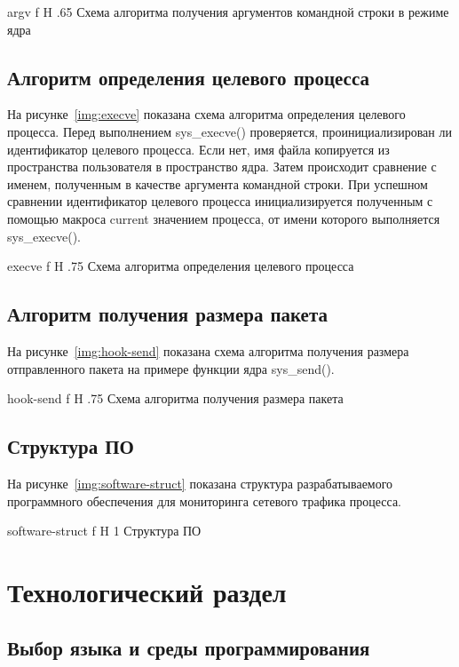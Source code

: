 \documentclass{bmstu}
\begin{document}
    {argv}
    {f}
    {H}
    {.65\textwidth}
    {Схема алгоритма получения аргументов командной строки в режиме ядра}

\pagebreak
\section{Алгоритм определения целевого процесса}

На рисунке~\ref{img:execve} показана схема алгоритма определения целевого процесса. 
Перед выполнением sys\_execve() проверяется, проинициализирован ли идентификатор целевого процесса. 
Если нет, имя файла копируется из пространства пользователя в пространство ядра. 
Затем происходит сравнение с именем, полученным в качестве аргумента командной строки. 
При успешном сравнении идентификатор целевого процесса инициализируется полученным с помощью макроса current значением процесса, от имени которого выполняется sys\_execve().

    {execve}
    {f}
    {H}
    {.75\textwidth}
    {Схема алгоритма определения целевого процесса}

\pagebreak
\section{Алгоритм получения размера пакета}

На рисунке~\ref{img:hook-send} показана схема алгоритма получения размера отправленного пакета на примере функции ядра sys\_send().

    {hook-send}
    {f}
    {H}
    {.75\textwidth}
    {Схема алгоритма получения размера пакета}

\pagebreak
\section{Структура ПО}

На рисунке~\ref{img:software-struct} показана структура разрабатываемого программного обеспечения для мониторинга сетевого трафика процесса.

    {software-struct}
    {f}
    {H}
    {1\textwidth}
    {Структура ПО} 

\chapter{Технологический раздел}

\section{Выбор языка и среды программирования}
\end{document}
